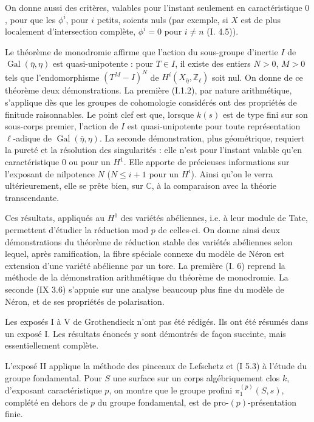 On donne aussi des critères, valables pour l'instant seulement en caractéristique
$0$, pour que les $\phi^i$, pour $i$ petits, soients nuls (par exemple, si $X$ est de plus
localement d'intersection complète, $\phi^i=0$ pour $i\ne n$ (I. 4.5)).
\clearpage

Le théorème de monodromie affirme que l'action du sous-groupe d'inertie $I$
de $\operatorname{Gal}(\bar\eta,\eta)$ est quasi-unipotente : pour $T\in I$, il existe des entiers $N>0$,
$M>0$ tels que l'endomorphisme $(T^M-I)^N$ de $H^i(X_{\bar\eta},\mathbb Z_\ell)$ soit nul. On donne de ce
théorème deux démonstrations. La première (I.1.2), par nature arithmétique, s'applique
dès que les groupes de cohomologie considérés ont des propriétés de finitude raisonnables.
Le point clef est que, lorsque $k(s)$ est de type fini sur son sous-corps
premier, l'action de $I$ est quasi-unipotente pour toute représentation $\ell$-adique de
$\operatorname{Gal}(\bar\eta,\eta)$. La seconde démonstration, plus géométrique, requiert la pureté et la résolution
des singularités : elle n'est pour l'instant valable qu'en caractéristique $0$
ou pour un $H^1$. Elle apporte de précieuses informations sur l'exposant de nilpotence
$N$ ($N\leq i+1$ pour un $H^i$). Ainsi qu'on le verra ultérieurement, elle se prête bien,
sur $\mathbb C$, à la comparaison avec la théorie transcendante.

Ces résultats, appliqués au $H^1$ des variétés abéliennes, i.e. à leur module
de Tate, permettent d'étudier la réduction mod $p$ de celles-ci. On donne ainsi deux
démonstrations du théorème de réduction stable des variétés abéliennes selon lequel,
après ramification, la fibre spéciale connexe du modèle de Néron est extension d'une
variété abélienne par un tore. La première (I. 6) reprend la méthode de la démonstration
arithmétique du théorème de monodromie. La seconde (IX 3.6) s'appuie sur une
analyse beaucoup plus fine du modèle de Néron, et de ses propriétés de polarisation.

Les exposés I à V de Grothendieck n'ont pas été rédigés. Ils ont été résumés
dans un exposé I. Les résultats énoncés y sont démontrés de façon succinte, mais
essentiellement complète.

L'exposé II applique la méthode des pinceaux de Lefschetz et (I 5.3) à
l'étude du groupe fondamental. Pour $S$ une surface sur un corps algébriquement clos
$k$, d'exposant caractéristique $p$, on montre que le groupe profini $\pi_1^{(p)}(S,s)$, complété
en dehors de $p$ du groupe fondamental, est de pro-$(p)$-présentation finie.

